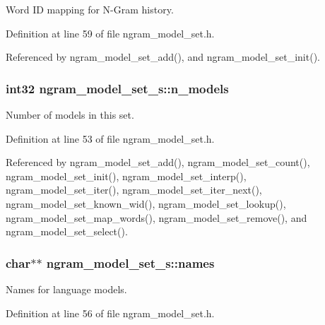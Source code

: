 Word I\+D mapping for N-\/\+Gram history. 



Definition at line 59 of file ngram\+\_\+model\+\_\+set.\+h.



Referenced by ngram\+\_\+model\+\_\+set\+\_\+add(), and ngram\+\_\+model\+\_\+set\+\_\+init().

\subsubsection[{n\+\_\+models}]{\setlength{\rightskip}{0pt plus 5cm}int32 ngram\+\_\+model\+\_\+set\+\_\+s\+::n\+\_\+models}\label{structngram__model__set__s_a6c28858d5631a9c9dbc7b2c9583f5c5a}


Number of models in this set. 



Definition at line 53 of file ngram\+\_\+model\+\_\+set.\+h.



Referenced by ngram\+\_\+model\+\_\+set\+\_\+add(), ngram\+\_\+model\+\_\+set\+\_\+count(), ngram\+\_\+model\+\_\+set\+\_\+init(), ngram\+\_\+model\+\_\+set\+\_\+interp(), ngram\+\_\+model\+\_\+set\+\_\+iter(), ngram\+\_\+model\+\_\+set\+\_\+iter\+\_\+next(), ngram\+\_\+model\+\_\+set\+\_\+known\+\_\+wid(), ngram\+\_\+model\+\_\+set\+\_\+lookup(), ngram\+\_\+model\+\_\+set\+\_\+map\+\_\+words(), ngram\+\_\+model\+\_\+set\+\_\+remove(), and ngram\+\_\+model\+\_\+set\+\_\+select().

\subsubsection[{names}]{\setlength{\rightskip}{0pt plus 5cm}char$\ast$$\ast$ ngram\+\_\+model\+\_\+set\+\_\+s\+::names}\label{structngram__model__set__s_aff5e13c45decde4c5bf30d8aa2b1c7d9}


Names for language models. 



Definition at line 56 of file ngram\+\_\+model\+\_\+set.\+h.



